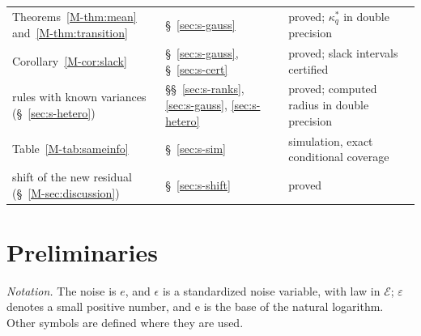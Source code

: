 \documentclass[11pt]{article}
\renewcommand{\_}{\usc\allowbreak}
\begin{document}
\begin{table}[h]
\begin{tabular}{>{\raggedright\arraybackslash}p{}>{\raggedright\arraybackslash}p{}>{\raggedright\arraybackslash}p{}}
Theorems~\ref{M-thm:mean} and~\ref{M-thm:transition} & \S~\ref{sec:s-gauss} & proved; $\kappa^*_q$ in double precision \\
Corollary~\ref{M-cor:slack} & \S~\ref{sec:s-gauss}, \S~\ref{sec:s-cert} & proved; slack intervals certified \\
rules with known variances (\S~\ref{sec:s-hetero}) & \S\S~\ref{sec:s-ranks}, \ref{sec:s-gauss}, \ref{sec:s-hetero} & proved; computed radius in double precision \\
Table~\ref{M-tab:sameinfo} & \S~\ref{sec:s-sim} & simulation, exact conditional coverage \\
shift of the new residual (\S~\ref{M-sec:discussion}) & \S~\ref{sec:s-shift} & proved \\
\bottomrule
\end{tabular}
\end{table}

\section{Preliminaries}\label{sec:s-prelim}

\emph{Notation.} The noise is $e$, and $\epsilon$ is a standardized noise variable, with law in $\mathcal E$; $\varepsilon$ denotes a small positive number, and $\mathrm{e}$ is the base of the natural logarithm. Other symbols are defined where they are used.
\end{document}
